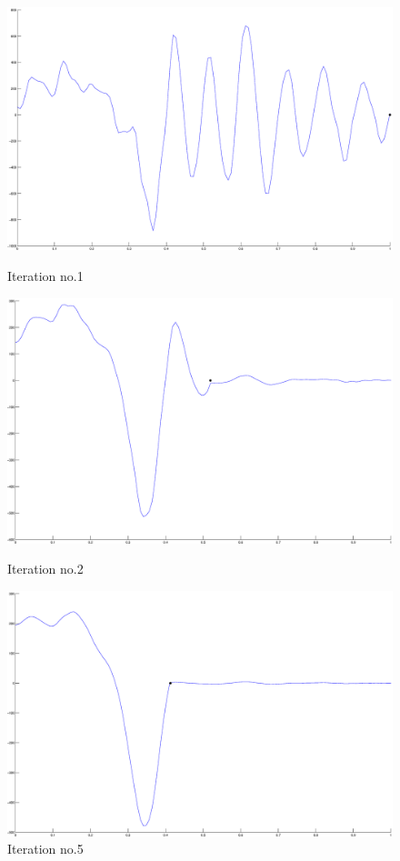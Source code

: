 \documentclass[12pt,a4]{article}
\begin{document}
\begin{figure}[H]
\begin{center}
 \includegraphics[scale=.2]{img/Approx_iter_onePer-1.eps}
 \caption{Iteration no.1}
 \includegraphics[scale=.2]{img/Approx_iter_onePer-2.eps}
 \caption{Iteration no.2}
 \includegraphics[scale=.2]{img/Approx_iter_onePer-4.eps}
 \caption{Iteration no.5}\label{fig:app2-end}
\end{center}
\end{figure}
\end{document}
